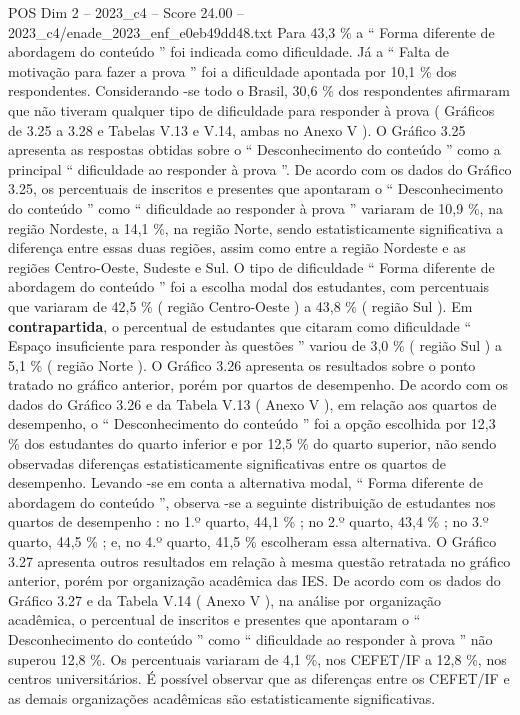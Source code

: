 \begin{textsample}{POS Dim 2 – 2023\_c4 – Score 24.00 – 2023\_c4/enade\_2023\_enf\_e0eb49dd48.txt}
Para 43,3 \% a “ Forma diferente de abordagem do conteúdo ” foi indicada como dificuldade.
Já a “ Falta de motivação para fazer a prova ” foi a dificuldade apontada por 10,1 \% dos respondentes.
Considerando -se todo o Brasil, 30,6 \% dos respondentes afirmaram que não tiveram qualquer tipo de dificuldade para responder à prova ( Gráficos de 3.25 a 3.28 e Tabelas V.13 e V.14, ambas no Anexo V ).
O Gráfico 3.25 apresenta as respostas obtidas sobre o “ Desconhecimento do conteúdo ” como a principal “ dificuldade ao responder à prova ”.
De acordo com os dados do Gráfico 3.25, os percentuais de inscritos e presentes que apontaram o “ Desconhecimento do conteúdo ” como “ dificuldade ao responder à prova ” variaram de 10,9 \%, na região Nordeste, a 14,1 \%, na região Norte, sendo estatisticamente significativa a diferença entre essas duas regiões, assim como entre a região Nordeste e as regiões Centro-Oeste, Sudeste e Sul.
O tipo de dificuldade “ Forma diferente de abordagem do conteúdo ” foi a escolha modal dos estudantes, com percentuais que variaram de 42,5 \% ( região Centro-Oeste ) a 43,8 \% ( região Sul ).
Em \textbf{contrapartida}, o percentual de estudantes que citaram como dificuldade “ Espaço insuficiente para responder às questões ” variou de 3,0 \% ( região Sul ) a 5,1 \% ( região Norte ).
O Gráfico 3.26 apresenta os resultados sobre o ponto tratado no gráfico anterior, porém por quartos de desempenho.
De acordo com os dados do Gráfico 3.26 e da Tabela V.13 ( Anexo V ), em relação aos quartos de desempenho, o “ Desconhecimento do conteúdo ” foi a opção escolhida por 12,3 \% dos estudantes do quarto inferior e por 12,5 \% do quarto superior, não sendo observadas diferenças estatisticamente significativas entre os quartos de desempenho.
Levando -se em conta a alternativa modal, “ Forma diferente de abordagem do conteúdo ”, observa -se a seguinte distribuição de estudantes nos quartos de desempenho : no 1.º quarto, 44,1 \% ; no 2.º quarto, 43,4 \% ; no 3.º quarto, 44,5 \% ; e, no 4.º quarto, 41,5 \% escolheram essa alternativa.
O Gráfico 3.27 apresenta outros resultados em relação à mesma questão retratada no gráfico anterior, porém por organização acadêmica das IES.
De acordo com os dados do Gráfico 3.27 e da Tabela V.14 ( Anexo V ), na análise por organização acadêmica, o percentual de inscritos e presentes que apontaram o “ Desconhecimento do conteúdo ” como “ dificuldade ao responder à prova ” não superou 12,8 \%.
Os percentuais variaram de 4,1 \%, nos CEFET/IF a 12,8 \%, nos centros universitários.
É possível observar que as diferenças entre os CEFET/IF e as demais organizações acadêmicas são estatisticamente significativas.

\end{textsample}
